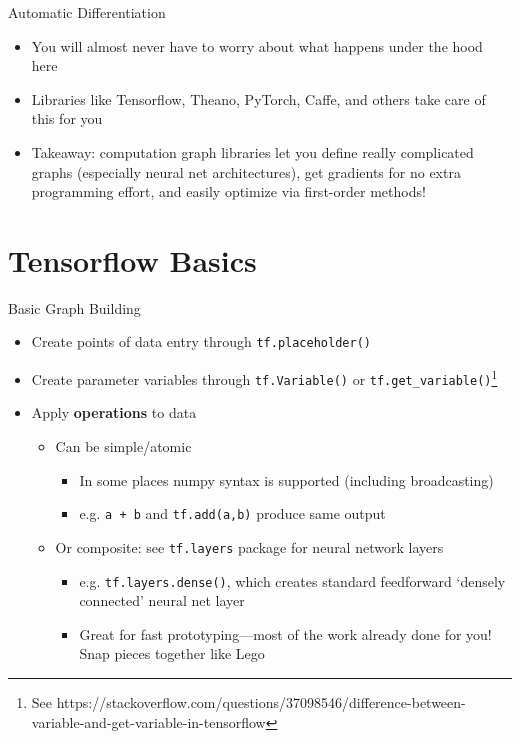 \documentclass[]{beamer}
\begin{document}
\begin{frame}{Automatic Differentiation}
\begin{itemize}
\item You will almost never have to worry about what happens under the hood here
\item Libraries like Tensorflow, Theano, PyTorch, Caffe, and others take care of this for you
\item Takeaway: computation graph libraries let you define really complicated graphs (especially neural net architectures), get gradients for no extra programming effort, and easily optimize via first-order methods!
\end{itemize}
\end{frame}


\section{Tensorflow Basics}

\begin{frame}[fragile]{Basic Graph Building}

\begin{itemize}
\item Create points of data entry through \verb|tf.placeholder()|
\item Create parameter variables through \verb|tf.Variable()| or \verb|tf.get_variable()|\footnote{See https://stackoverflow.com/questions/37098546/difference-between-variable-and-get-variable-in-tensorflow}
\item Apply \textbf{operations} to data
\begin{itemize}
\item Can be simple/atomic
\begin{itemize}
\item In some places numpy syntax is supported (including broadcasting)
\item e.g. \verb|a + b| and \verb|tf.add(a,b)| produce same output
\end{itemize}
\item Or composite: see \verb|tf.layers| package for neural network layers
\begin{itemize}
\item e.g. \verb|tf.layers.dense()|, which creates standard feedforward `densely connected' neural net layer
\item Great for fast prototyping---most of the work already done for you! Snap pieces together like Lego
\end{itemize}
\end{itemize}
\end{itemize}

\end{frame}
\end{document}
